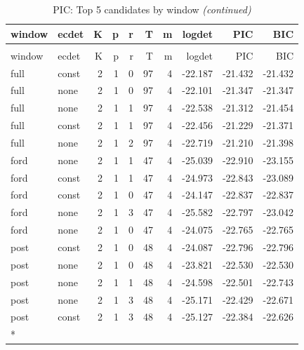 \begingroup\fontsize{9}{11}\selectfont

\begin{longtable}[t]{llrrrrrrrr}
\caption{\label{tab:tab:pic_top5_by_window}PIC: Top 5 candidates by window}\\
\toprule
window & ecdet & K & p & r & T & m & logdet & PIC & BIC\\
\midrule
\endfirsthead
\caption[]{PIC: Top 5 candidates by window \textit{(continued)}}\\
\toprule
window & ecdet & K & p & r & T & m & logdet & PIC & BIC\\
\midrule
\endhead

\endfoot
\bottomrule
\endlastfoot
full & const & 2 & 1 & 0 & 97 & 4 & -22.187 & -21.432 & -21.432\\
full & none & 2 & 1 & 0 & 97 & 4 & -22.101 & -21.347 & -21.347\\
full & none & 2 & 1 & 1 & 97 & 4 & -22.538 & -21.312 & -21.454\\
full & const & 2 & 1 & 1 & 97 & 4 & -22.456 & -21.229 & -21.371\\
full & none & 2 & 1 & 2 & 97 & 4 & -22.719 & -21.210 & -21.398\\
\addlinespace
ford & none & 2 & 1 & 1 & 47 & 4 & -25.039 & -22.910 & -23.155\\
ford & const & 2 & 1 & 1 & 47 & 4 & -24.973 & -22.843 & -23.089\\
ford & const & 2 & 1 & 0 & 47 & 4 & -24.147 & -22.837 & -22.837\\
ford & none & 2 & 1 & 3 & 47 & 4 & -25.582 & -22.797 & -23.042\\
ford & none & 2 & 1 & 0 & 47 & 4 & -24.075 & -22.765 & -22.765\\
\addlinespace
post & const & 2 & 1 & 0 & 48 & 4 & -24.087 & -22.796 & -22.796\\
post & none & 2 & 1 & 0 & 48 & 4 & -23.821 & -22.530 & -22.530\\
post & none & 2 & 1 & 1 & 48 & 4 & -24.598 & -22.501 & -22.743\\
post & none & 2 & 1 & 3 & 48 & 4 & -25.171 & -22.429 & -22.671\\
post & const & 2 & 1 & 3 & 48 & 4 & -25.127 & -22.384 & -22.626\\*
\end{longtable}
\endgroup{}
